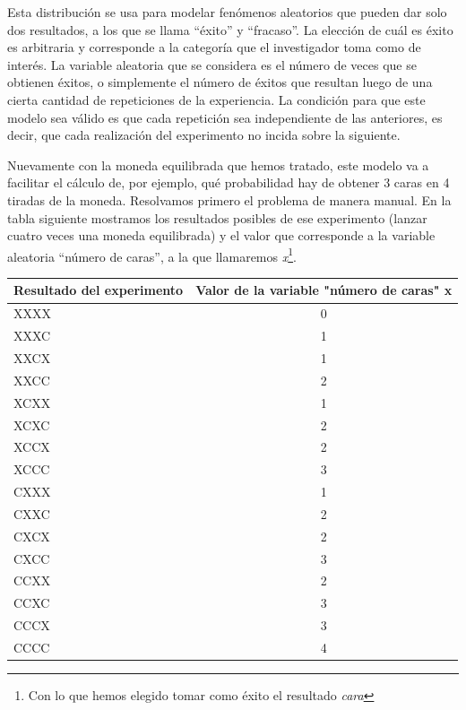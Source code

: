 \documentclass[]{book}
\let\rmarkdownfootnote\footnote%
\def\footnote{\protect\rmarkdownfootnote}
\begin{document}
Esta distribución se usa para modelar fenómenos aleatorios que pueden
dar solo dos resultados, a los que se llama ``éxito'' y ``fracaso''. La
elección de cuál es éxito es arbitraria y corresponde a la categoría que
el investigador toma como de interés. La variable aleatoria que se
considera es el número de veces que se obtienen éxitos, o simplemente el
número de éxitos que resultan luego de una cierta cantidad de
repeticiones de la experiencia. La condición para que este modelo sea
válido es que cada repetición sea independiente de las anteriores, es
decir, que cada realización del experimento no incida sobre la
siguiente.

Nuevamente con la moneda equilibrada que hemos tratado, este modelo va a
facilitar el cálculo de, por ejemplo, qué probabilidad hay de obtener 3
caras en 4 tiradas de la moneda. Resolvamos primero el problema de
manera manual. En la tabla siguiente mostramos los resultados posibles
de ese experimento (lanzar cuatro veces una moneda equilibrada) y el
valor que corresponde a la variable aleatoria ``número de caras'', a la
que llamaremos \emph{x}\footnote{Con lo que hemos elegido tomar como éxito el resultado \emph{cara}}.

\begin{table}[H]
\centering
\begin{tabular}{lc}
\toprule
Resultado del experimento & Valor de la variable "número de caras" x\\
\midrule
\rowcolor{gray!6}  XXXX & 0\\
XXXC & 1\\
\rowcolor{gray!6}  XXCX & 1\\
XXCC & 2\\
\rowcolor{gray!6}  XCXX & 1\\
\addlinespace
XCXC & 2\\
\rowcolor{gray!6}  XCCX & 2\\
XCCC & 3\\
\rowcolor{gray!6}  CXXX & 1\\
CXXC & 2\\
\addlinespace
\rowcolor{gray!6}  CXCX & 2\\
CXCC & 3\\
\rowcolor{gray!6}  CCXX & 2\\
CCXC & 3\\
\rowcolor{gray!6}  CCCX & 3\\
\addlinespace
CCCC & 4\\
\bottomrule
\end{tabular}
\end{table}
\end{document}
